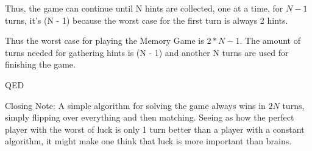 \documentclass[12pt]{article}
\begin{document}
Thus, the game can continue until N hints are collected, one at a time, for $N - 1$ turns, it's (N - 1) because the worst case for the first turn is always 2 hints.

Thus the worst case for playing the Memory Game is $2*N - 1$. The amount of turns needed for gathering hints is (N - 1) and another N turns are used for finishing the game.

QED


Closing Note: A simple algorithm for solving the game always wins in $2N$ turns, simply flipping over everything and then matching. Seeing as how the perfect player with the worst of luck is only 1 turn better than a player with a constant algorithm, it might make one think that luck is more important than brains.
\end{document}
